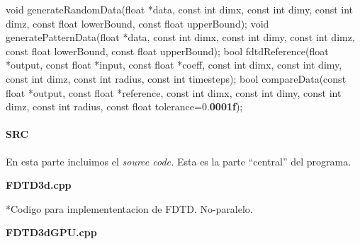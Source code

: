 \documentclass[]{article}
\newenvironment{Shaded}{\begin{snugshade}}{\end{snugshade}}
\newcommand{\DataTypeTok}[1]{\textcolor[rgb]{0.13,0.29,0.53}{{#1}}}
\newcommand{\FloatTok}[1]{\textcolor[rgb]{0.00,0.00,0.81}{{#1}}}
\newcommand{\AttributeTok}[1]{\textcolor[rgb]{0.77,0.63,0.00}{{#1}}}
\newcommand{\ErrorTok}[1]{\textcolor[rgb]{0.64,0.00,0.00}{\textbf{{#1}}}}
\newcommand{\NormalTok}[1]{{#1}}
\let\oldparagraph\paragraph
\renewcommand{\paragraph}[1]{\oldparagraph{#1}\mbox{}}
\begin{document}
\begin{Shaded}
\begin{Highlighting}[]
\DataTypeTok{void} \NormalTok{generateRandomData(}\DataTypeTok{float} \NormalTok{*data, }\AttributeTok{const} \DataTypeTok{int} \NormalTok{dimx, }\AttributeTok{const} \DataTypeTok{int} \NormalTok{dimy, }\AttributeTok{const} \DataTypeTok{int} \NormalTok{dimz, }\AttributeTok{const} \DataTypeTok{float} \NormalTok{lowerBound, }\AttributeTok{const} \DataTypeTok{float} \NormalTok{upperBound);}
\DataTypeTok{void} \NormalTok{generatePatternData(}\DataTypeTok{float} \NormalTok{*data, }\AttributeTok{const} \DataTypeTok{int} \NormalTok{dimx, }\AttributeTok{const} \DataTypeTok{int} \NormalTok{dimy, }\AttributeTok{const} \DataTypeTok{int} \NormalTok{dimz, }\AttributeTok{const} \DataTypeTok{float} \NormalTok{lowerBound, }\AttributeTok{const} \DataTypeTok{float} \NormalTok{upperBound);}
\DataTypeTok{bool} \NormalTok{fdtdReference(}\DataTypeTok{float} \NormalTok{*output, }\AttributeTok{const} \DataTypeTok{float} \NormalTok{*input, }\AttributeTok{const} \DataTypeTok{float} \NormalTok{*coeff, }\AttributeTok{const} \DataTypeTok{int} \NormalTok{dimx, }\AttributeTok{const} \DataTypeTok{int} \NormalTok{dimy, }\AttributeTok{const} \DataTypeTok{int} \NormalTok{dimz, }\AttributeTok{const} \DataTypeTok{int} \NormalTok{radius, }\AttributeTok{const} \DataTypeTok{int} \NormalTok{timesteps);}
\DataTypeTok{bool} \NormalTok{compareData(}\AttributeTok{const} \DataTypeTok{float} \NormalTok{*output, }\AttributeTok{const} \DataTypeTok{float} \NormalTok{*reference, }\AttributeTok{const} \DataTypeTok{int} \NormalTok{dimx, }\AttributeTok{const} \DataTypeTok{int} \NormalTok{dimy, }\AttributeTok{const} \DataTypeTok{int} \NormalTok{dimz, }\AttributeTok{const} \DataTypeTok{int} \NormalTok{radius, }\AttributeTok{const} \DataTypeTok{float} \NormalTok{tolerance=}\FloatTok{0.}\ErrorTok{0001f}\NormalTok{);}
\end{Highlighting}
\end{Shaded}

\paragraph{SRC}\label{src}

En esta parte incluimos el \emph{source code.} Esta es la parte
``central'' del programa.

\textbf{FDTD3d.cpp}

*Codigo para implemententacion de FDTD. No-paralelo.

\textbf{FDTD3dGPU.cpp}
\end{document}
